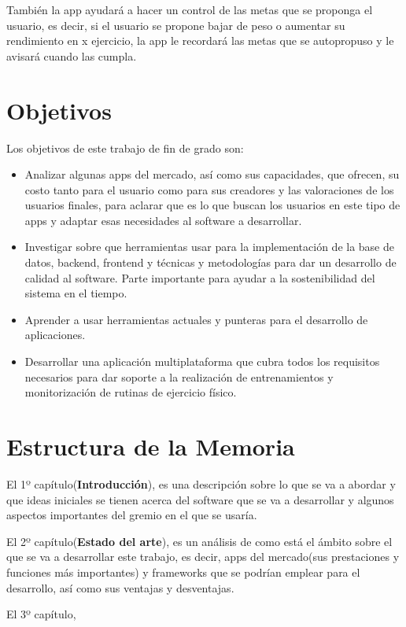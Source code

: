 También la app ayudará a hacer un control de las metas que se proponga el usuario, es decir, si el usuario se propone bajar de peso o aumentar su rendimiento en x ejercicio, la app le recordará las metas que se autopropuso y le avisará cuando las cumpla. 

\section{Objetivos}
Los objetivos de este trabajo de fin de grado son:

\begin{itemize}
	\item Analizar algunas apps del mercado, así como sus capacidades, que ofrecen, su costo tanto para el usuario como para sus creadores y las valoraciones de los usuarios finales, para aclarar que es lo que buscan los usuarios en este tipo de apps y adaptar esas necesidades al software a desarrollar.
	\item Investigar sobre que herramientas usar para la implementación de la base de datos, backend, frontend y técnicas y metodologías para dar un desarrollo de calidad al software. Parte importante para ayudar a la sostenibilidad del sistema en el tiempo.
	\item Aprender a usar herramientas actuales y punteras para el desarrollo de aplicaciones.
	\item Desarrollar una aplicación multiplataforma que cubra todos los requisitos necesarios para dar soporte a la realización de entrenamientos y monitorización de rutinas de ejercicio físico.
\end{itemize}

\section{Estructura de la Memoria}

El 1º capítulo(\textbf{Introducción}), es una descripción sobre lo que se va a abordar y que ideas iniciales se tienen acerca del software que se va a desarrollar y algunos aspectos importantes del gremio en el que se usaría.

El 2º capítulo(\textbf{Estado del arte}), es un análisis de como está el ámbito sobre el que se va a desarrollar este trabajo, es decir, apps del mercado(sus prestaciones y funciones más importantes) y frameworks que se podrían emplear para el desarrollo, así como sus ventajas y desventajas.

El 3º capítulo,
